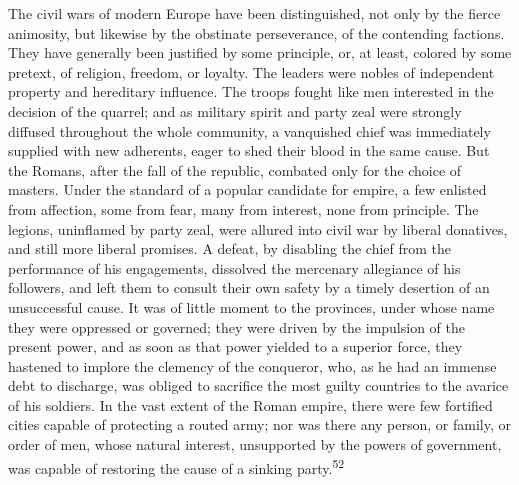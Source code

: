 The civil wars of modern Europe have been distinguished, not only
by the fierce animosity, but likewise by the obstinate
perseverance, of the contending factions. They have generally
been justified by some principle, or, at least, colored by some
pretext, of religion, freedom, or loyalty. The leaders were
nobles of independent property and hereditary influence. The
troops fought like men interested in the decision of the quarrel;
and as military spirit and party zeal were strongly diffused
throughout the whole community, a vanquished chief was
immediately supplied with new adherents, eager to shed their
blood in the same cause. But the Romans, after the fall of the
republic, combated only for the choice of masters. Under the
standard of a popular candidate for empire, a few enlisted from
affection, some from fear, many from interest, none from
principle. The legions, uninflamed by party zeal, were allured
into civil war by liberal donatives, and still more liberal
promises. A defeat, by disabling the chief from the performance
of his engagements, dissolved the mercenary allegiance of his
followers, and left them to consult their own safety by a timely
desertion of an unsuccessful cause. It was of little moment to
the provinces, under whose name they were oppressed or governed;
they were driven by the impulsion of the present power, and as
soon as that power yielded to a superior force, they hastened to
implore the clemency of the conqueror, who, as he had an immense
debt to discharge, was obliged to sacrifice the most guilty
countries to the avarice of his soldiers. In the vast extent of
the Roman empire, there were few fortified cities capable of
protecting a routed army; nor was there any person, or family, or
order of men, whose natural interest, unsupported by the powers
of government, was capable of restoring the cause of a sinking
party.\textsuperscript{52}



